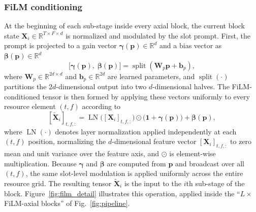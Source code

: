 \documentclass[conference,letterpaper]{IEEEtran}
\begin{document}
	\subsubsection{FiLM conditioning}
	At the beginning of each sub-stage inside every axial block, the current block state $\mathbf{X}_i\in\mathbb{R}^{T\times F\times d}$ is normalized and modulated by the slot prompt.
	First, the prompt is projected to a gain vector $\boldsymbol{\gamma}(\mathbf{p})\in\mathbb{R}^{d}$ and a bias vector as $\boldsymbol{\beta}(\mathbf{p})\in\mathbb{R}^{d}$
	\begin{equation}
		\label{eq:film_params}
		\bigl[\boldsymbol{\gamma}(\mathbf{p}),\;\boldsymbol{\beta}(\mathbf{p})\bigr]
		=
		\operatorname{split}\!\left(\mathbf{W}_{p}\mathbf{p}+\mathbf{b}_{p}\right),
	\end{equation}
	where $\mathbf{W}_{p}\in\mathbb{R}^{2d\times d}$ and $\mathbf{b}_{p}\in\mathbb{R}^{2d}$ are learned parameters, and $\operatorname{split}(\cdot)$ partitions the $2d$-dimensional output into two $d$-dimensional halves.
	The FiLM-conditioned tensor is then formed by applying these vectors uniformly to every resource element $(t,f)$ according to
	\begin{equation}
		\label{eq:film}
		[\widetilde{\mathbf{X}}_i]_{t,f,:}
		=
		\operatorname{LN}\!\bigl([\mathbf{X}_i]_{t,f,:}\bigr)
		\odot
		\bigl(\mathbf{1}+\boldsymbol{\gamma}(\mathbf{p})\bigr)
		+
		\boldsymbol{\beta}(\mathbf{p}),
	\end{equation}
	where $\operatorname{LN}(\cdot)$ denotes layer normalization applied independently at each $(t,f)$ position, normalizing the $d$-dimensional feature vector $[\mathbf{X}_i]_{t,f,:}$ to zero mean and unit variance over the feature axis, and $\odot$ is element-wise multiplication. 	Because $\boldsymbol{\gamma}$ and $\boldsymbol{\beta}$ are computed from $\mathbf{p}$ and broadcast over all $(t,f)$, the same slot-level modulation is applied uniformly across the entire resource grid. 
The resulting tensor $\widetilde{\mathbf{X}}_i$ is the input to the $i$th sub-stage of the block. Figure~\ref{fig:film_detail} illustrates this operation, applied inside the ``$L\times$ FiLM-axial blocks'' of Fig.~\ref{fig:pipeline}.


	
\end{document}
